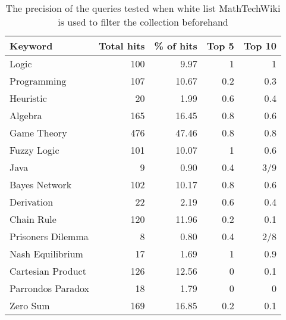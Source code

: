 \begin{table}[H]
\centering
\begin{tabular} {|| p{10em} | r | r | r | r ||} 
 \hline
 Keyword & Total hits & \% of hits & Top 5 & Top 10 \\ [0.5ex] 
 \hline

Logic & 100 & 9.97 & 1 & 1 \\
Programming & 107 & 10.67 & 0.2 & 0.3 \\
Heuristic & 20 & 1.99 & 0.6 & 0.4 \\
Algebra & 165 & 16.45 & 0.8 & 0.6 \\
Game Theory & 476 & 47.46 & 0.8 & 0.8 \\
\hline
Fuzzy Logic & 101 & 10.07 & 1 & 0.6 \\
Java & 9 & 0.90 & 0.4 & 3/9 \\
Bayes Network & 102 & 10.17 & 0.8 & 0.6 \\
Derivation & 22 & 2.19 & 0.6 & 0.4 \\
\hline
Chain Rule & 120 & 11.96 & 0.2 & 0.1 \\
Prisoners Dilemma & 8 & 0.80 & 0.4 & 2/8 \\
Nash Equilibrium & 17 & 1.69 & 1 & 0.9 \\
Cartesian Product & 126 & 12.56 & 0 & 0.1 \\
Parrondos Paradox & 18 & 1.79 & 0 & 0 \\
Zero Sum & 169 & 16.85 & 0.2 & 0.1 \\

 \hline
\end{tabular}
\caption{The precision of the queries tested when white list MathTechWiki is used to filter the collection beforehand}
\label{table:p_test_list4}
\end{table}



\cleardoublepage